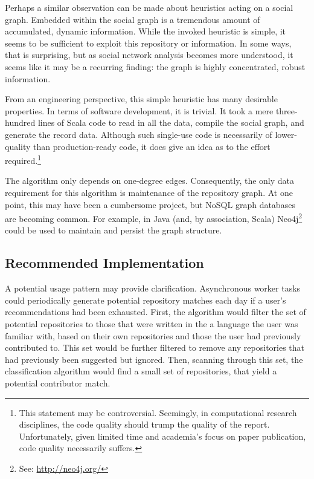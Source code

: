 \documentclass{article}
\begin{document}
  Perhaps a similar observation can be made about heuristics acting on a social graph. Embedded within the social graph is a tremendous amount of accumulated, dynamic information. While the invoked heuristic is simple, it seems to be sufficient to exploit this repository or information. In some ways, that is surprising, but as social network analysis becomes more understood, it seems like it may be a recurring finding: the graph is highly concentrated, robust information.

  From an engineering perspective, this simple heuristic has many desirable properties. In terms of software development, it is trivial. It took a mere three-hundred lines of Scala code to read in all the data, compile the social graph, and generate the record data. Although such single-use code is necessarily of lower-quality than production-ready code, it does give an idea as to the effort required.\footnote{This statement may be controversial. Seemingly, in computational research disciplines, the code quality should trump the quality of the report. Unfortunately, given limited time and academia's focus on paper publication, code quality necessarily suffers.}

  The algorithm only depends on one-degree edges. Consequently, the only data requirement for this algorithm is maintenance of the repository graph. At one point, this may have been a cumbersome project, but NoSQL graph databases are becoming common. For example, in Java (and, by association, Scala) Neo4j\footnote{See: \href{http://neo4j.org/}{http://neo4j.org/} } could be used to maintain and persist the graph structure. 

  \subsection{Recommended Implementation}

  A potential usage pattern may provide clarification. Asynchronous worker tasks could periodically generate potential repository matches each day if a user's recommendations had been exhausted. First, the algorithm would filter the set of potential repositories to those that were written in the a language the user was familiar with, based on their own repositories and those the user had previously contributed to. This set would be further filtered to remove any repositories that had previously been suggested but ignored. Then, scanning through this set, the classification algorithm would find a small set of repositories, that yield a potential contributor match.
\end{document}
